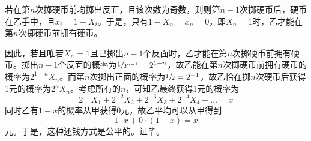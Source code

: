 若在第$n$次掷硬币前均掷出反面，且该次数为奇数，则则第$n - 1$次掷硬币后，硬币在乙手中，且$x_i = 1 - X_i$。于是，只有$1 - X_n = x_n = 0$，即$X_n = 1$时，乙才能在第$n$次掷硬币前拥有硬币。

因此，若且唯若$X_n = 1$且已掷出$n - 1$个反面时，乙才能在第$n$次掷硬币前拥有硬币。掷出$n - 1$个反面的概率为$\sfrac1{2^{n - 1}} = 2^{1 - n}$，故乙能在第$n$次掷硬币前拥有硬币的概率为$2^{1 - n}X_n$。而第$n$次掷出正面的概率为$\sfrac12 = 2^{-1}$，故乙恰在掷$n$次硬币后获得1元的概率为$2^nX_n$。考虑所有的$n$，可知乙最终获得1元的概率为
\[ 2^{-1}X_1 + 2^{-2}X_2 + 2^{-3}X_3 + 2^{-4}X_4 + \dots = x \]
同时乙有$1 - x$的概率从甲获得0元，故乙平均可以从甲得到
\[ 1\cdot x + 0\cdot(1 - x) = x \]
元。于是，这种还钱方式是公平的。证毕。
